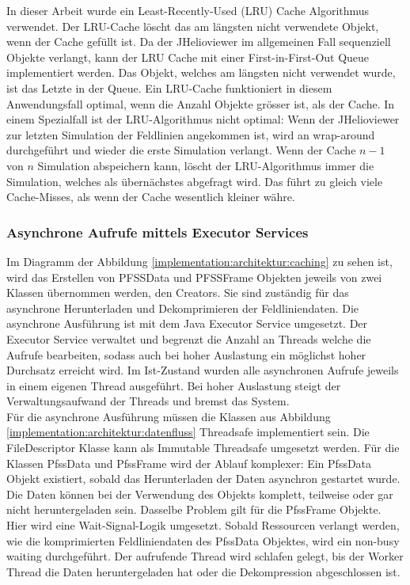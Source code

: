 In dieser Arbeit wurde ein Least-Recently-Used (LRU) Cache Algorithmus verwendet. Der LRU-Cache löscht das am längsten nicht verwendete Objekt, wenn der Cache gefüllt ist. Da der JHelioviewer im allgemeinen Fall sequenziell Objekte verlangt, kann der LRU Cache mit einer First-in-First-Out Queue implementiert werden. Das Objekt, welches am längsten nicht  verwendet wurde, ist das Letzte in der Queue. Ein LRU-Cache funktioniert in diesem Anwendungsfall optimal, wenn die Anzahl Objekte grösser ist, als der Cache. In einem Spezialfall ist der LRU-Algorithmus nicht optimal: Wenn der JHelioviewer zur letzten Simulation der Feldlinien angekommen ist, wird an wrap-around durchgeführt und wieder die erste Simulation verlangt. Wenn der Cache $n-1$ von $n$ Simulation abspeichern kann, löscht der LRU-Algorithmus immer die Simulation, welches als übernächstes abgefragt wird. Das führt zu gleich viele Cache-Misses, als wenn der Cache wesentlich kleiner währe.

\subsubsection{Asynchrone Aufrufe mittels Executor Services}
Im Diagramm der Abbildung \ref{implementation:architektur:caching} zu sehen ist, wird das Erstellen von PFSSData und PFSSFrame Objekten jeweils von zwei Klassen übernommen werden, den Creators. Sie sind zuständig für das asynchrone Herunterladen und Dekomprimieren der Feldliniendaten. Die asynchrone Ausführung ist mit dem Java Executor Service umgesetzt. Der Executor Service verwaltet und begrenzt die Anzahl an Threads welche die Aufrufe bearbeiten, sodass auch bei hoher Auslastung ein möglichst hoher Durchsatz erreicht wird. Im Ist-Zustand wurden alle asynchronen Aufrufe jeweils in einem eigenen Thread ausgeführt. Bei hoher Auslastung steigt der Verwaltungsaufwand der Threads und bremst das System.\\
Für die asynchrone Ausführung müssen die Klassen aus Abbildung \ref{implementation:architektur:datenfluss} Threadsafe implementiert sein. Die FileDescriptor Klasse kann als Immutable Threadsafe umgesetzt werden. Für die Klassen PfssData und PfssFrame wird der Ablauf komplexer: Ein PfssData Objekt existiert, sobald das Herunterladen der Daten asynchron gestartet wurde. Die Daten können bei der Verwendung des Objekts komplett, teilweise oder gar nicht heruntergeladen sein. Dasselbe Problem gilt für die PfssFrame Objekte. Hier wird eine Wait-Signal-Logik umgesetzt. Sobald Ressourcen verlangt werden, wie die komprimierten Feldliniendaten des PfssData Objektes, wird ein non-busy waiting durchgeführt. Der aufrufende Thread wird schlafen gelegt, bis der Worker Thread die Daten heruntergeladen hat oder die Dekompression abgeschlossen ist.